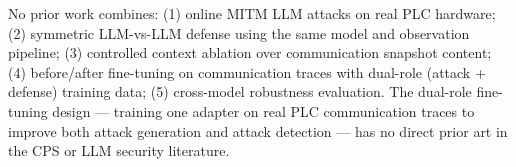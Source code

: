 \documentclass[11pt]{article}
\begin{document}
No prior work combines: (1) online MITM LLM attacks on real PLC hardware; (2) symmetric LLM-vs-LLM defense using the same model and observation pipeline; (3) controlled context ablation over communication snapshot content; (4) before/after fine-tuning on communication traces with dual-role (attack + defense) training data; (5) cross-model robustness evaluation. The dual-role fine-tuning design --- training one adapter on real PLC communication traces to improve both attack generation and attack detection --- has no direct prior art in the CPS or LLM security literature.
\end{document}
